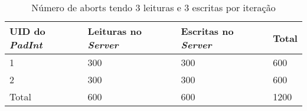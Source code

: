 \begin{table}[H]
\centering
\begin{tabular}{| p{1.5cm} | p{1.5cm} | p{1.5cm} | p{1.5cm} |}
\hline
\textbf{UID do \textit{PadInt}} & \textbf{Leituras no \textit{Server}} & \textbf{Escritas no \textit{Server}} & \textbf{Total} \\
\hline
1 & 300 & 300 & 600  \\
\hline
2 & 300 & 300 & 600  \\
\hline
Total & 600 & 600 & 1200  \\
\hline
\end{tabular}
\caption{Número de aborts tendo 3 leituras e 3 escritas por iteração} \label{figCAborts}
\end{table}